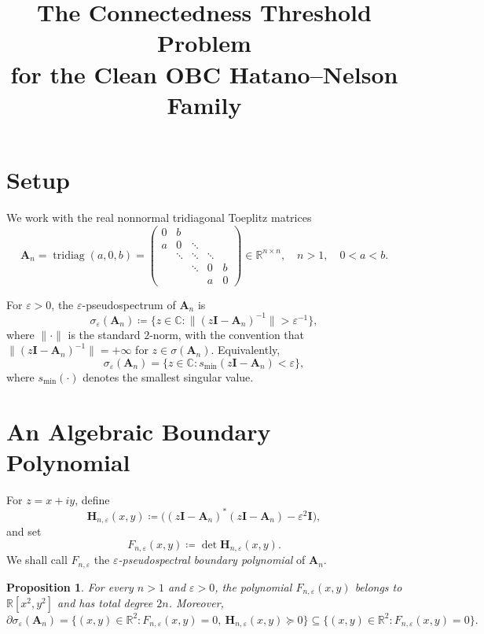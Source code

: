\documentclass[11pt]{article}
\title{The Connectedness Threshold Problem\\
for the Clean OBC Hatano--Nelson Family}
\author{}
\date{}
\newtheorem{proposition}[theorem]{Proposition}
\begin{document}
\maketitle

\section{Setup}

We work with the real nonnormal tridiagonal Toeplitz matrices
\[
\mathbf{A}_n=\operatorname{tridiag}(a,0,b)
=\begin{pmatrix}
0 & b \\
a & 0 & \ddots \\
& \ddots & \ddots & \ddots \\
&& \ddots & 0 & b \\
&&& a & 0
\end{pmatrix}
\in\mathbb{R}^{n\times n},
\quad n>1, \quad 0<a<b.
\]

For $\varepsilon>0$, the $\varepsilon$-pseudospectrum of $\mathbf{A}_n$ is
\[
\sigma_\varepsilon(\mathbf{A}_n)\coloneqq\{z\in\mathbb{C}\colon\|(z\mathbf{I}-\mathbf{A}_n)^{-1}\|>\varepsilon^{-1}\},
\]
where $\|\cdot\|$ is the standard $2$-norm, with the convention that
$\|(z\mathbf{I}-\mathbf{A}_n)^{-1}\|=+\infty$ for $z\in\sigma(\mathbf{A}_n)$.
Equivalently,
\[
\sigma_\varepsilon(\mathbf{A}_n)
=\{z\in\mathbb{C}\colon s_{\min}(z\mathbf{I}-\mathbf{A}_n)<\varepsilon\},
\]
where $s_{\min}(\cdot)$ denotes the smallest singular value.

\section{An Algebraic Boundary Polynomial}

For $z=x+iy$, define
\[
\mathbf{H}_{n,\varepsilon}(x,y)
\coloneqq
\bigl((z\mathbf{I}-\mathbf{A}_n)^*(z\mathbf{I}-\mathbf{A}_n)-\varepsilon^2\mathbf{I}\bigr),
\]
and set
\[
F_{n,\varepsilon}(x,y)\coloneqq \det \mathbf{H}_{n,\varepsilon}(x,y).
\]
We shall call $F_{n,\varepsilon}$ the \emph{$\varepsilon$-pseudospectral boundary polynomial}
of $\mathbf{A}_n$.

\begin{proposition}\label{prop:boundary-polynomial}
For every $n>1$ and $\varepsilon>0$, the polynomial $F_{n,\varepsilon}(x,y)$ belongs to
$\mathbb{R}[x^2,y^2]$ and has total degree $2n$. Moreover,
\[
\partial\sigma_\varepsilon(\mathbf{A}_n)
=\bigl\{(x,y)\in\mathbb{R}^2\colon F_{n,\varepsilon}(x,y)=0,
\ \mathbf{H}_{n,\varepsilon}(x,y)\succeq 0\bigr\}
\subseteq
\bigl\{(x,y)\in\mathbb{R}^2\colon F_{n,\varepsilon}(x,y)=0\bigr\}.
\]
\end{proposition}
\end{document}

